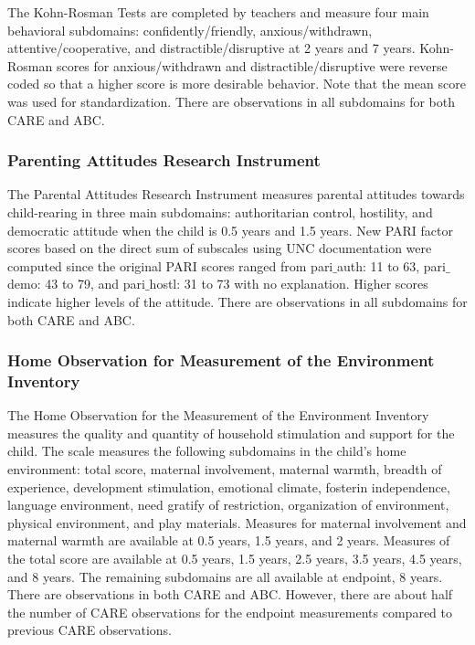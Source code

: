   The Kohn-Rosman Tests are completed by teachers and measure four main behavioral subdomains: confidently/friendly, anxious/withdrawn, attentive/cooperative, and distractible/disruptive at 2 years and 7 years. Kohn-Rosman scores for anxious/withdrawn and distractible/disruptive were reverse coded so that a higher score is more desirable behavior. Note that the mean score was used for standardization. There are observations in all subdomains for both CARE and ABC. 

  \subsubsection{Parenting Attitudes Research Instrument}

  The Parental Attitudes Research Instrument measures parental attitudes towards child-rearing in three main subdomains: authoritarian control, hostility, and democratic attitude when the child is 0.5 years and 1.5 years. New PARI factor scores based on the direct sum of subscales using UNC documentation were computed since the original PARI scores ranged from pari$\_$auth: 11 to 63, pari$\_$demo: 43 to 79, and pari$\_$hostl: 31 to 73 with no explanation. Higher scores indicate higher levels of the attitude. There are observations in all subdomains for both CARE and ABC. 

  \subsubsection{Home Observation for Measurement of the Environment Inventory}

  The Home Observation for the Measurement of the Environment Inventory measures the quality and quantity of household stimulation and support for the child. The scale measures the following subdomains in the child's home environment: total score, maternal involvement, maternal warmth, breadth of experience, development stimulation, emotional climate, fosterin independence, language environment, need gratify of restriction, organization of environment, physical environment, and play materials. Measures for maternal involvement and maternal warmth are available at 0.5 years, 1.5 years, and 2 years. Measures of the total score are available at 0.5 years, 1.5 years, 2.5 years, 3.5 years, 4.5 years, and 8 years. The remaining subdomains are all available at endpoint, 8 years. There are observations in both CARE and ABC. However, there are about half the number of CARE observations for the endpoint measurements compared to previous CARE observations. 

